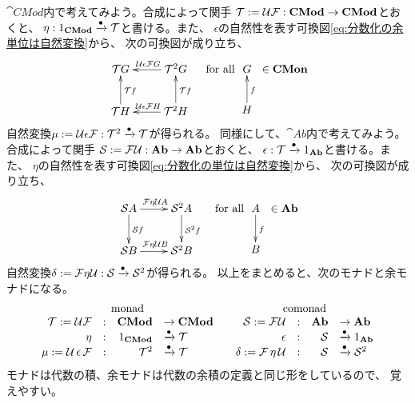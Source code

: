 {	$\cat{CMod}$内で考えてみよう。合成によって関手
	$\mathcal{T}:=\mathcal{U}\mathcal{F}:{\mathbf{{CMod}}}\to{\ensuremath{\mathbf{{CMod}}}}$とおくと、
	$\eta:1_{\mathbf{{CMod}}}\xrightarrow[{}]{\bullet}\mathcal{T}$と書ける。また、
	$\epsilon$の自然性を表す可換図\ref{eq:分数化の余単位は自然変換}から、
	次の可換図が成り立ち、
	\begin{equation*}\begin{split}
		\xymatrix{
			\calT G & \calT^2 G \ar[l]_{\calU\epsilon\calF G} \\
			\calT H \ar[u]_{\calT f} & \calT^2 H \ar[l]_{\calU\epsilon\calF H} 
			\ar[u]_{\calT f}
		} \quad\text{for all } \xymatrix{
			G \\ H \ar[u]_f
		} \in\cat{CMon}
	\end{split}\end{equation*}
	自然変換$\mu:=\mathcal{U}\epsilon\mathcal{F}:\mathcal{T}^2\xrightarrow[{}]{\bullet}\mathcal{T}$が得られる。
	同様にして、$\cat{Ab}$内で考えてみよう。合成によって関手
	$\mathcal{S}:=\mathcal{F}\mathcal{U}:{\mathbf{{Ab}}}\to{\ensuremath{\mathbf{{Ab}}}}$とおくと、
	$\epsilon:\mathcal{T}\xrightarrow[{}]{\bullet}1_{\mathbf{{Ab}}}$と書ける。また、
	$\eta$の自然性を表す可換図\ref{eq:分数化の単位は自然変換}から、
	次の可換図が成り立ち、
	\begin{equation*}\begin{split}
		\xymatrix{
			\calS A \ar[r]^{\calF\eta\calU A} \ar[d]^{\calS f} 
			& \calS^2 A \ar[d]^{\calS^2 f} \\
			\calS B \ar[r]^{\calF\eta\calU B} & \calS^2 B
		} \quad\text{for all } \xymatrix{
			A \ar[d]^f \\ B
		} \in\cat{Ab}
	\end{split}\end{equation*}
	自然変換$\delta:=\mathcal{F}\eta\mathcal{U}:\mathcal{S}\xrightarrow[{}]{\bullet}\mathcal{S}^2$が得られる。
	以上をまとめると、次のモナドと余モナドになる。
	\begin{equation*}\begin{array}{cc}
		\text{monad} & \text{comonad} \\
		\begin{array}{rcrl}
			\mathcal{T} := \mathcal{U}\mathcal{F} &:& {\mathbf{{CMod}}} &\to {\ensuremath{\mathbf{{CMod}}}} \\
			\eta &:& 1_{\mathbf{{CMod}}} &\xrightarrow[{}]{\bullet} \mathcal{T} \\
			\mu := \mathcal{U}\,\epsilon\,\mathcal{F} &:& \mathcal{T}^2 &\xrightarrow[{}]{\bullet} \mathcal{T} \\
		\end{array} & \begin{array}{rcrl}
			\mathcal{S} := \mathcal{F}\mathcal{U} &:& {\mathbf{{Ab}}} &\to {\ensuremath{\mathbf{{Ab}}}} \\
			\epsilon &:& \mathcal{S} &\xrightarrow[{}]{\bullet} 1_{\mathbf{{Ab}}} \\
			\delta := \mathcal{F}\,\eta\,\mathcal{U} &:& \mathcal{S} &\xrightarrow[{}]{\bullet} \mathcal{S}^2 \\
		\end{array}
	\end{array}\end{equation*}
	モナドは代数の積、余モナドは代数の余積の定義と同じ形をしているので、
	覚えやすい。

}
